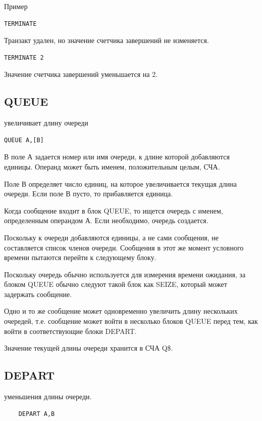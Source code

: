 \documentclass[14pt]{extarticle}
\begin{document}
Пример

\begin{lstlisting}
TERMINATE
\end{lstlisting}

Транзакт удален, но значение счетчика завершений не изменяется.

\begin{lstlisting}
TERMINATE 2
\end{lstlisting}

Значение счетчика завершений уменьшается на 2.

\subsection*{QUEUE}

увеличивает длину очереди

\begin{lstlisting}
QUEUE A,[B]	
\end{lstlisting}

В поле А задается номер или имя очереди, к длине которой добавляются единицы. Операнд может быть именем, положительным целым, СЧА.

Поле В определяет число единиц, на которое увеличивается текущая длина очереди. Если поле В пусто, то прибавляется единица.

Когда сообщение входит в блок QUEUE, то ищется очередь с именем, определенным операндом А. Если необходимо, очередь создается.

Поскольку к очереди добавляются единицы, а не сами сообщения, не составляется список членов очереди. Сообщения в этот же момент условного времени пытаются перейти к следующему блоку.

Поскольку очередь обычно используется для измерения времени ожидания, за блоком QUEUE обычно следуют такой блок как SEIZE, который может задержать сообщение.

Одно и то же сообщение может одновременно увеличить длину нескольких очередей, т.е. сообщение может войти в несколько блоков QUEUE перед тем, как войти в соответствующие блоки DEPART.

Значение текущей длины очереди хранится в СЧА Q\$<имя очереди>.

\subsection*{DEPART}

уменьшения длины очереди.

\begin{lstlisting}
	DEPART A,B
\end{lstlisting}
\end{document}
